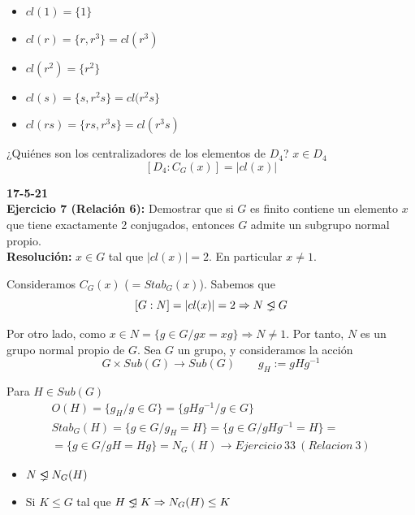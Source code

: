 \documentclass{article}
\newcommand{\unlhdneq}{%
  \mathrel{\ooalign{$\lneq$\cr\raise.22ex\hbox{$\lhd$}\cr}}}
\begin{document}
\begin{itemize}
\item $cl(1)=\{1\}$ 

\item $cl(r)=\{r,r^3\}=cl(r^3)$

\item $cl(r^2)=\{r^2\}$

\item $cl(s)=\{s,r^2s\}=cl(r^2s\}$

\item $cl(rs)=\{rs,r^3s\}=cl(r^3s)$
\end{itemize}

¿Quiénes son los centralizadores de los elementos de $D_4$? $x\in D_4$
\begin{equation*}
\left[D_4:C_G(x)\right]=|cl(x)|
\end{equation*}

\textbf{17-5-21} \\

\textbf{Ejercicio 7 (Relación 6):} Demostrar que si $G$ es finito contiene un elemento $x$ que tiene exactamente 2 conjugados, entonces $G$ admite un subgrupo normal propio. \\

\textbf{Resolución:} $x\in G$ tal que $|cl(x)|=2$. En particular $x\neq 1$.

Consideramos $C_G(x)$ ($=Stab_G(x)$). Sabemos que 
\begin{equation*}
\left[G:N\right]=|cl(x)|=2\Rightarrow N\unlhdneq G
\end{equation*}

Por otro lado, como $x\in N=\{g\in G/gx=xg\}\Rightarrow N\neq 1$. Por tanto, $N$ es un grupo normal propio de $G$. Sea $G$ un grupo, y consideramos la acción
\begin{equation*}
G\times Sub(G)\longrightarrow Sub(G)\qquad g_H:=gHg^{-1}
\end{equation*}

Para $H\in Sub(G)$
\begin{gather*}
O(H)=\{g_H/g\in G\}=\{gHg^{-1}/g\in G\} \\
Stab_G(H)=\{g\in G/g_H=H\}=\{g\in G/gHg^{-1}=H\}=\\
=\{g\in G/gH=Hg\}=N_G(H) \longrightarrow Ejercicio\:33\:(Relacion\:3)
\end{gather*}

\begin{itemize}
\item $N\unlhdneq N_G(H)$

\item Si $K\leq G$ tal que $H\unlhdneq K\Rightarrow N_G(H)\leq K$
\end{itemize}
\end{document}
